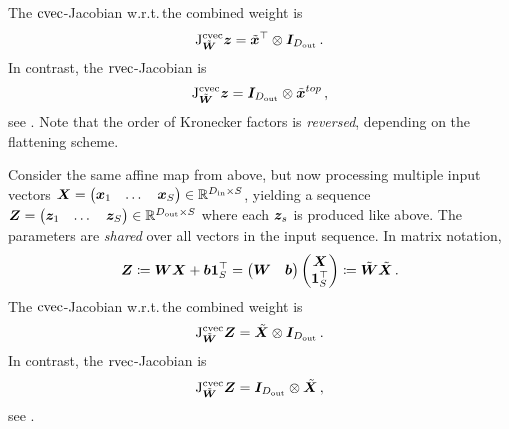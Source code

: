 \begin{paracol}{2}
\begin{example}
          The $\operatorname{cvec}$-Jacobian w.r.t.\,the combined weight is
          \begin{align*}
            \mathrm{J}^{\operatorname{cvec}}_{\tilde{{\bm{W}}}}{\bm{z}}
            =
            \tilde{{\bm{x}}}^{\top}
            \otimes
            {\bm{I}}_{D_{\text{out}}}\,.
          \end{align*}
          In contrast, the $\operatorname{rvec}$-Jacobian is
          \begin{align*}
            \mathrm{J}^{\operatorname{cvec}}_{\tilde{{\bm{W}}}}{\bm{z}}
            =
            {\bm{I}}_{D_{\text{out}}}
            \otimes
            \tilde{{\bm{x}}}^{top}\,,
          \end{align*}
          see .
          Note that the order of Kronecker factors is \emph{reversed}, depending on the flattening scheme.
        \end{example}

        \begin{example}
          Consider the same affine map from above, but now processing multiple input vectors ${\bm{X}} = \begin{pmatrix}{\bm{x}}_1 & \dots & {\bm{x}}_S\end{pmatrix} \in {\mathbb{R}}^{D_{\text{in}}\times S}$, yielding a sequence ${\bm{Z}} = \begin{pmatrix} {\bm{z}}_1 & \dots & {\bm{z}}_S\end{pmatrix} \in {\mathbb{R}}^{D_{\text{out}}\times S}$ where each ${\bm{z}}_s$ is produced like above.
          The parameters are \emph{shared} over all vectors in the input sequence.
          In matrix notation,
          \begin{align*}
            {\bm{Z}}
            \coloneqq
            {\bm{W}} {\bm{X}} + {\bm{b}} {\bm{1}}^{\top}_S
            =
            \begin{pmatrix}
              {\bm{W}} & {\bm{b}}
            \end{pmatrix}
            \begin{pmatrix}
              {\bm{X}} \\ {\bm{1}}^{\top}_S
            \end{pmatrix}
            \coloneqq
            \tilde{{\bm{W}}}
            \tilde{{\bm{X}}}\,.
          \end{align*}
          The $\operatorname{cvec}$-Jacobian w.r.t.\,the combined weight is
          \begin{align*}
            \mathrm{J}^{\operatorname{cvec}}_{\tilde{{\bm{W}}}}{\bm{Z}}
            =
            \tilde{{\bm{X}}}
            \otimes
            {\bm{I}}_{D_{\text{out}}}\,.
          \end{align*}
          In contrast, the $\operatorname{rvec}$-Jacobian is
          \begin{align*}
            \mathrm{J}^{\operatorname{cvec}}_{\tilde{{\bm{W}}}}{\bm{Z}}
            =
            {\bm{I}}_{D_{\text{out}}}
            \otimes
            \tilde{{\bm{X}}}\,,
          \end{align*}
          see .
        \end{example}

        \switchcolumn[1]

      \end{paracol}
